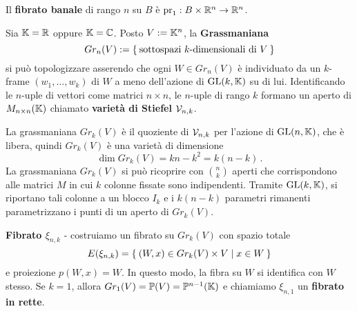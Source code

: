 \begin{ex}
	\begin{rmnumerate}
		\item Il \textbf{fibrato banale} di rango $n$ su 
		$B$ è $\mathrm{pr}_{1}:B \times {\mathbb R}^{n} \to {\mathbb R}^{n}$.
		
		\item Sia $\mathbb{K} = {\mathbb R}$ oppure $\mathbb{K} = \mathbb{C}$.
		Posto $V := \mathbb{K}^{n}$, la \textbf{Grassmaniana} 
		\begin{equation*}
			Gr_{n}(V) := \Set{\text{sottospazi } k\text{-dimensionali di } V}
		\end{equation*}
		si può topologizzare asserendo che ogni $W \in Gr_{n}(V)$
		è individuato da un $k$-frame $(w_{1}, \dots, w_{k})$ di $W$
		a meno dell'azione di $\mathrm{GL}(k,\mathbb{K})$ su di lui.
		Identificando le $n$-uple di vettori come matrici $n \times n$,
		le $n$-uple di rango $k$ formano un aperto di $M_{n \times n}(\mathbb{K})$
		chiamato \textbf{varietà di Stiefel} $\mathcal{V}_{n,k}$. 
		
		La grassmaniana $Gr_{k}(V)$ è il quoziente di $\mathcal{V}_{n,k}$
		per l'azione di $\mathrm{GL}(n,\mathbb{K})$, che è libera,
		quindi $Gr_{k}(V)$ è una varietà di dimensione
		\begin{equation*}
			\dim Gr_{k}(V) = kn - k^2 = k(n-k)\,.
		\end{equation*}
		La grassmaniana $Gr_{k}(V)$ si può ricoprire con $\binom{n}{k}$ aperti
		che corrispondono alle matrici $M$ in cui $k$ colonne fissate sono indipendenti.
		Tramite $\mathrm{GL}(k,\mathbb{K})$, si riportano tali colonne a un blocco $I_{k}$
		e i $k(n-k)$ parametri rimanenti parametrizzano i punti di un aperto di $Gr_{k}(V)$.
		
		\textbf{Fibrato $\xi_{n,k}$} - costruiamo un fibrato su $Gr_{k}(V)$
		con spazio totale
		\begin{equation*}
			E(\xi_{n,k}) = \Set{(W,x) \in Gr_{k}(V) \times V | x \in W}
		\end{equation*}
		e proiezione $p(W,x)=W$. In questo modo,
		la fibra su $W$ si identifica con $W$ stesso.
		Se $k=1$, allora $Gr_{1}(V) = \mathbb{P}(V) = \mathbb{P}^{n-1}(\mathbb{K})$ e chiamiamo
		$\xi_{n,1}$ un \textbf{fibrato in rette}.
		

\end{rmnumerate}
\end{ex}

